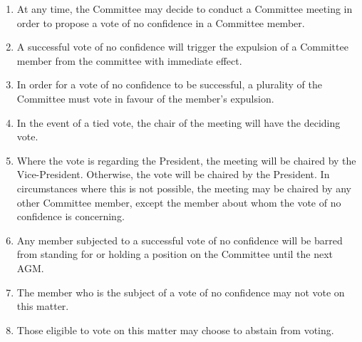 \documentclass[12pt]{constitution}
\begin{document}
\begin{enumerate}
    \item At any time, the Committee may decide to conduct a Committee meeting in order to propose a vote of no confidence in a Committee member.

    \item A successful vote of no confidence will trigger the expulsion of a Committee member from the committee with immediate effect.
    
    \item In order for a vote of no confidence to be successful, a plurality of the Committee must vote in favour of the member's expulsion.

    \item In the event of a tied vote, the chair of the meeting will have the deciding vote.

    \item Where the vote is regarding the President, the meeting will be chaired by the Vice-President. Otherwise, the vote will be chaired by the President. In circumstances where this is not possible, the meeting may be chaired by any other Committee member, except the member about whom the vote of no confidence is concerning.

    \item Any member subjected to a successful vote of no confidence will be barred from standing for or holding a position on the Committee until the next AGM.

    \item The member who is the subject of a vote of no confidence may not vote on this matter.

    \item Those eligible to vote on this matter may choose to abstain from voting.
\end{enumerate}


\label{clause:disciplinary-action}
\end{document}

